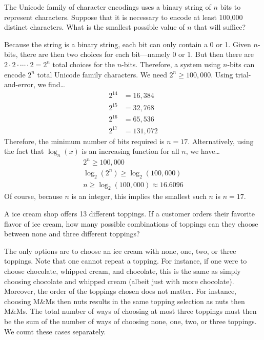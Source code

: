 \documentclass[11pt,letterpaper]{article}
\begin{document}

 The Unicode family of character encodings uses a binary string of $n$ bits to represent characters. Suppose that it is necessary to encode at least 100,000 distinct characters. What is the smallest possible value of $n$ that will suffice? \pspace

\sol Because the string is a binary string, each bit can only contain a 0 or 1. Given $n$-bits, there are then two choices for each bit---namely 0 or 1. But then there are $2 \cdot 2 \cdot \cdots \cdot 2= 2^n$ total choices for the $n$-bits. Therefore, a system using $n$-bits can encode $2^n$ total Unicode family characters. We need $2^n \geq 100,\!000$. Using trial-and-error, we find\dots
	\[
	\begin{aligned}
	2^{14}&= 16,\!384 \\
	2^{15}&= 32,\!768 \\
	2^{16}&= 65,\!536 \\
	2^{17}&= 131,\!072
	\end{aligned}
	\]
Therefore, the minimum number of bits required is $n= 17$. Alternatively, using the fact that $\log_n(x)$ is an increasing function for all $n$, we have\dots
	\[
	\begin{gathered}
	2^n \geq 100,\!000 \\
	\log_2(2^n) \geq \log_2(100,\!000) \\
	n \geq \log_2(100,\!000) \approx 16.6096
	\end{gathered}
	\]
Of course, because $n$ is an integer, this implies the smallest such $n$ is $n= 17$. 



\newpage



 A ice cream shop offers 13 different toppings. If a customer orders their favorite flavor of ice cream, how many possible combinations of toppings can they choose between none and three different toppings? \pspace

\sol The only options are to choose an ice cream with none, one, two, or three toppings. Note that one cannot repeat a topping. For instance, if one were to choose chocolate, whipped cream, and chocolate, this is the same as simply choosing chocolate and whipped cream (albeit just with more chocolate). Moreover, the order of the toppings chosen does not matter. For instance, choosing M\&Ms then nuts results in the same topping selection as nuts then M\&Ms. The total number of ways of choosing at most three toppings must then be the sum of the number of ways of choosing none, one, two, or three toppings. We count these cases separately. \pspace
\end{document}
